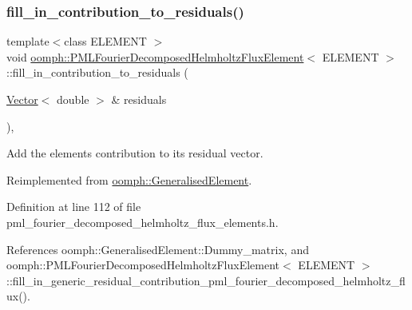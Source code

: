 \subsubsection{\texorpdfstring{fill\+\_\+in\+\_\+contribution\+\_\+to\+\_\+residuals()}{fill\_in\_contribution\_to\_residuals()}}
{\footnotesize\ttfamily template$<$class E\+L\+E\+M\+E\+NT $>$ \\
void \hyperlink{classoomph_1_1PMLFourierDecomposedHelmholtzFluxElement}{oomph\+::\+P\+M\+L\+Fourier\+Decomposed\+Helmholtz\+Flux\+Element}$<$ E\+L\+E\+M\+E\+NT $>$\+::fill\+\_\+in\+\_\+contribution\+\_\+to\+\_\+residuals (\begin{DoxyParamCaption}\item[{\hyperlink{classoomph_1_1Vector}{Vector}$<$ double $>$ \&}]{residuals }\end{DoxyParamCaption})\hspace{0.3cm}{\ttfamily [inline]}, {\ttfamily [virtual]}}



Add the element\textquotesingle{}s contribution to its residual vector. 



Reimplemented from \hyperlink{classoomph_1_1GeneralisedElement_a310c97f515e8504a48179c0e72c550d7}{oomph\+::\+Generalised\+Element}.



Definition at line 112 of file pml\+\_\+fourier\+\_\+decomposed\+\_\+helmholtz\+\_\+flux\+\_\+elements.\+h.



References oomph\+::\+Generalised\+Element\+::\+Dummy\+\_\+matrix, and oomph\+::\+P\+M\+L\+Fourier\+Decomposed\+Helmholtz\+Flux\+Element$<$ E\+L\+E\+M\+E\+N\+T $>$\+::fill\+\_\+in\+\_\+generic\+\_\+residual\+\_\+contribution\+\_\+pml\+\_\+fourier\+\_\+decomposed\+\_\+helmholtz\+\_\+flux().

\mbox{\label{classoomph_1_1PMLFourierDecomposedHelmholtzFluxElement_a810a3c1e0ef99cf88cfed7e6e4b0d3c1}} 
